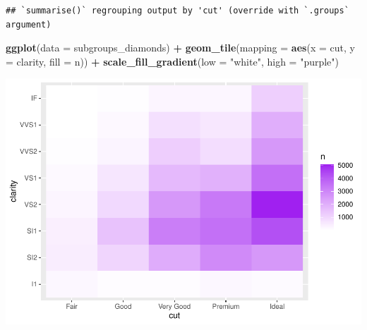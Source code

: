 \documentclass[
]{book}
\newenvironment{Shaded}{\begin{snugshade}}{\end{snugshade}}
\newcommand{\CommentTok}[1]{\textcolor[rgb]{0.56,0.35,0.01}{\textit{#1}}}
\newcommand{\DataTypeTok}[1]{\textcolor[rgb]{0.13,0.29,0.53}{#1}}
\newcommand{\KeywordTok}[1]{\textcolor[rgb]{0.13,0.29,0.53}{\textbf{#1}}}
\newcommand{\NormalTok}[1]{#1}
\newcommand{\OperatorTok}[1]{\textcolor[rgb]{0.81,0.36,0.00}{\textbf{#1}}}
\newcommand{\StringTok}[1]{\textcolor[rgb]{0.31,0.60,0.02}{#1}}
\begin{document}
\begin{Shaded}
\end{Shaded}

\begin{verbatim}
## `summarise()` regrouping output by 'cut' (override with `.groups` argument)
\end{verbatim}

\begin{Shaded}
\begin{Highlighting}[]
\KeywordTok{ggplot}\NormalTok{(}\DataTypeTok{data =}\NormalTok{ subgroups_diamonds) }\OperatorTok{+}\StringTok{ }\KeywordTok{geom_tile}\NormalTok{(}\DataTypeTok{mapping =} \KeywordTok{aes}\NormalTok{(}\DataTypeTok{x =}\NormalTok{ cut,}
    \DataTypeTok{y =}\NormalTok{ clarity, }\DataTypeTok{fill =}\NormalTok{ n)) }\OperatorTok{+}\StringTok{ }\KeywordTok{scale_fill_gradient}\NormalTok{(}\DataTypeTok{low =} \StringTok{"white"}\NormalTok{,}
    \DataTypeTok{high =} \StringTok{"purple"}\NormalTok{)}
\end{Highlighting}
\end{Shaded}

\includegraphics{_main_files/figure-latex/unnamed-chunk-257-3.pdf}

\begin{Shaded}
\end{Shaded}
\end{document}
